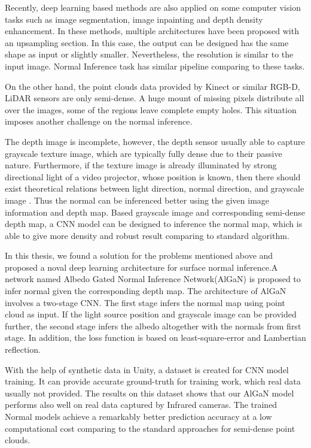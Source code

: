 Recently, deep learning based methods are also applied on some computer vision tasks such as image segmentation, image inpainting and depth density enhancement. In these methods, multiple architectures have been proposed with an upsampling section. In this case, the output can be designed has the same shape as input or slightly smaller. Nevertheless, the resolution is similar to the input image. Normal Inference task has similar pipeline comparing to these tasks.

On the other hand, the point clouds data provided by Kinect or similar RGB-D, LiDAR sensors are only semi-dense. A huge mount of missing pixels distribute all over the images, some of the regions leave complete empty holes. This situation imposes another challenge on the normal inference. 

The depth image is incomplete, however, the depth sensor usually able to capture grayscale texture image, which are typically fully dense due to their passive nature. Furthermore, if the texture image is already illuminated by strong directional light of a video projector, whose position is known, then there should exist theoretical relations between light direction, normal direction, and grayscale image . Thus the normal can be inferenced better using the given image information and depth map.  Based grayscale image and corresponding semi-dense depth map, a CNN model can be designed to inference the normal map, which is able to give more density and robust result comparing to standard algorithm. 




In this thesis, we found a solution for the problems mentioned above and proposed a noval deep learning architecture for surface normal inference.A network named Albedo Gated Normal Inference Network(AlGaN) is proposed to infer normal given the corresponding depth map. The architecture of AlGaN involves a two-stage CNN. The first stage infers the normal map using point cloud as input. If the light source position and grayscale image can be provided further, the second stage infers the albedo altogether with the normals from first stage. In addition, the loss function is based on least-square-error and Lambertian reflection.

With the help of synthetic data in Unity, a dataset is created for CNN model training. It can provide accurate ground-truth for training work, which real data usually not provided. The results on this dataset shows that our AlGaN model performs also well on real data captured by Infrared cameras. The trained Normal models achieve a remarkably better prediction accuracy at a low computational cost comparing to the standard approaches for semi-dense point clouds. 





